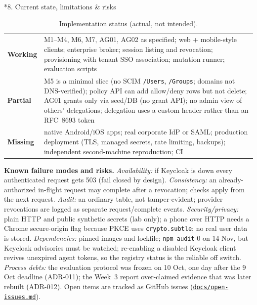 \documentclass[11pt]{article}
\makeatletter
\newcommand{\code}[1]{\texttt{\small #1}}
\newcommand{\repo}{https://github.com/krishnateja2314/iam-provider}
\newcommand{\gh}[2]{\href{\repo/blob/cs5903-final-2026/#1}{#2}}
\renewcommand\section{\@startsection{section}{1}{0pt}{-10pt plus -2pt}{4pt}{\large\bfseries}}
\makeatother
\begin{document}
\section*{8. Current state, limitations \& risks}
\begin{table}[H]
\centering\small
\begin{tabularx}{\textwidth}{@{}P{2.0cm} L@{}}
\toprule
\textbf{Working} & M1--M4, M6, M7, AG01, AG02 as specified; web + mobile-style clients; enterprise broker; session listing and revocation; provisioning with tenant SSO association; mutation runner; evaluation scripts\\
\textbf{Partial} & M5 is a minimal slice (no SCIM \code{/Users}, \code{/Groups}; domains not DNS-verified); policy API can add allow/deny rows but not delete; AG01 grants only via seed/DB (no grant API); no admin view of others' delegations; delegation uses a custom header rather than an RFC~8693 token\\
\textbf{Missing} & native Android/iOS apps; real corporate IdP or SAML; production deployment (TLS, managed secrets, rate limiting, backups); independent second-machine reproduction; CI\\
\bottomrule
\end{tabularx}
\caption{Implementation status (actual, not intended).}
\end{table}
\textbf{Known failure modes and risks.} \emph{Availability:} if Keycloak is down every authenticated request gets 503 (fail closed by design). \emph{Consistency:} an already-authorized in-flight request may complete after a revocation; checks apply from the next request. \emph{Audit:} an ordinary table, not tamper-evident; provider revocations are logged as separate request/complete events. \emph{Security/privacy:} plain HTTP and public synthetic secrets (lab only); a phone over HTTP needs a Chrome secure-origin flag because PKCE uses \code{crypto.subtle}; no real user data is stored. \emph{Dependencies:} pinned images and lockfile; \code{npm audit} 0 on 14 Nov, but Keycloak advisories must be watched; re-enabling a disabled Keycloak client revives unexpired agent tokens, so the registry status is the reliable off switch. \emph{Process debts:} the evaluation protocol was frozen on 10 Oct, one day after the 9 Oct deadline (ADR-011); the Week~3 report over-claimed evidence that was later rebuilt (ADR-012). Open items are tracked as GitHub issues (\gh{docs/open-issues.md}{\code{docs/open-issues.md}}).

\end{document}
